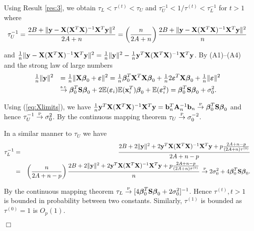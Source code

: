 \documentclass[11pt]{article}
\newtheorem{Main Result}{Main Result}
\def\vectorfontone{\bf}
\def\vectorfonttwo{\boldsymbol}
\def\vb{{\vectorfontone b}}                      %
\def\vw{{\vectorfontone w}}                      %
\def\vx{{\vectorfontone x}}                      %
\def\vy{{\vectorfontone y}}                      %
\def\vbeta{{\vectorfonttwo \beta}}               %
\def\vvarepsilon{{\vectorfonttwo \varepsilon}}   %
\def\matrixfontone{\bf}
\def\matrixfonttwo{\boldsymbol}
\def\mA{{\matrixfontone A}}                      %
\def\mS{{\matrixfontone S}}                      %
\def\mX{{\matrixfontone X}}                      %
\def\mSigma{{\matrixfonttwo \Sigma}}             %
\def\bE{{\mathbb E}}                             %
\def\ds{\displaystyle}
\newcommand{\cyc}[1]{{\color{black}#1}}
\begin{document}
\cyc{ Using Result \ref{res:3}, we obtain
	$\tau_L <  \tau^{(t)} < \tau_U$ and $\tau_U^{-1} <  1/\tau^{(t)} < \tau_L^{-1}$ for $t>1$ where
	$$
	\begin{array}{rl}
	\ds \tau_U^{-1}
	= \frac{2B + \|\vy - \mX(\mX^T\mX)^{-1}\mX^T\vy\|^2}{2A + n}
	= \left(\frac{n}{2A + n}\right)
	\frac{2B + \|\vy - \mX(\mX^T\mX)^{-1}\mX^T\vy\|^2}{n}
	\end{array}
	$$
	
	\noindent and
	$\tfrac{1}{n}\|\vy - \mX(\mX^T\mX)^{-1}\mX^T\vy\|^2
	= \tfrac{1}{n}\|\vy\|^2 - \tfrac{1}{n}\vy^T\mX(\mX^T\mX)^{-1}\mX^T\vy$.
	By (A1)--(A4) and the strong law of large numbers
	$$
	\begin{array}{rl}
	\ds \tfrac{1}{n}\|\vy\|^2
	& \ds= \tfrac{1}{n}\|\mX\vbeta_0 + \vvarepsilon\|^2
	= \tfrac{1}{n}
	\vbeta_0^T\mX^T\mX\vbeta_0
	+ \tfrac{1}{n}2\vvarepsilon^T\mX\vbeta_0
	+ \tfrac{1}{n}\|\vvarepsilon\|^2\\ [1ex]
	&\ds\stackrel{\mbox{\tiny a.s.}}{\to}
	\vbeta_0^T\mS\vbeta_0 + 2\bE(\vvarepsilon_i)\bE(\vx_i^T)\vbeta_0+ \bE(\vvarepsilon^2_i)
	=\vbeta_0^T\mS\vbeta_0 + \sigma_0^2.
	\end{array}
	$$
	
	\noindent Using (\ref{eq:Xlimits}), we have
	$\tfrac{1}{n}\vy^T\mX(\mX^T\mX)^{-1}\mX^T\vy
	= \vb_n^T\mA_n^{-1}\vb_n
	\stackrel{\mbox{\tiny P}}{\to}  \vbeta_0^T\mS\vbeta_0$ and hence $\tau_U^{-1}
	\stackrel{\mbox{\tiny P}}{\to} \sigma_0^2$. By the continuous mapping theorem
	$\tau_U \stackrel{\mbox{\tiny P}}{\to} \sigma_0^{-2}$.
	
	In a similar manner to $\tau_U$ we have
	\begin{eqnarray*}
		\ds \tau_L^{-1}
		&=& \frac{
			2B + 2\|\vy\|^2 + 2\vy^T\mX(\mX^T\mX)^{-1}\mX^T\vy + p\frac{2A + n -p}{(2A + n)\tau^{(0)}}}{2A + n -p }\\
		&=& \left( \frac{n}{2A + n - p} \right)
		\frac{2B + 2\|\vy\|^2 + 2\vy^T\mX(\mX^T\mX)^{-1}\mX^T\vy +   p\frac{2A + n -p}{(2A + n)\tau^{(0)}}}{n}\stackrel{\mbox{\tiny P}}{\to}
		2\sigma_0^2 + 4\vbeta_0^T\mS\vbeta_0.
	\end{eqnarray*}
	
	\noindent By the continuous mapping theorem
	$\tau_L \stackrel{\mbox{\tiny P}}{\to}
	[4\vbeta_0^T\mS\vbeta_0 + 2\sigma_0^2]^{-1}
	$. Hence $\tau^{(t)}, t>1$ is bounded in probability between two constants.
	Similarly, $\tau^{(1)}$ is bounded as $\tau^{(0)}=1$ is $O_p(1)$.
	\vspace{-0.5cm}\begin{flushright}$\Box$\end{flushright}
}
\end{document}
